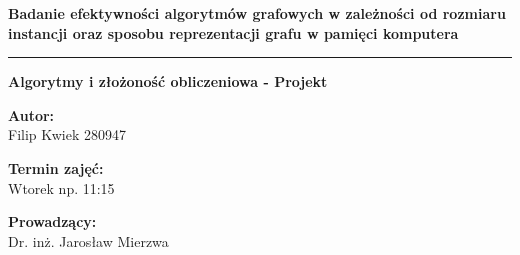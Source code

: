 \documentclass{article}
\begin{document}
\vspace{75pt}

\begin{center}
    \textbf{\large Badanie efektywności algorytmów grafowych w zależności od rozmiaru instancji oraz sposobu
reprezentacji grafu w pamięci komputera} 
    \vspace{2pt}
    \hrule
    \vspace{4pt}
    \textbf{\large Algorytmy i złożoność obliczeniowa - Projekt} 
\end{center}

\vspace{75pt}

\begin{center}
    \textbf{Autor: } \\
    Filip Kwiek 280947
\end{center}

\begin{center}
    \textbf{Termin zajęć: } \\
    Wtorek np. 11:15
\end{center}

\begin{center}
    \textbf{Prowadzący: } \\
    Dr. inż. Jarosław Mierzwa
\end{center}
\end{document}

